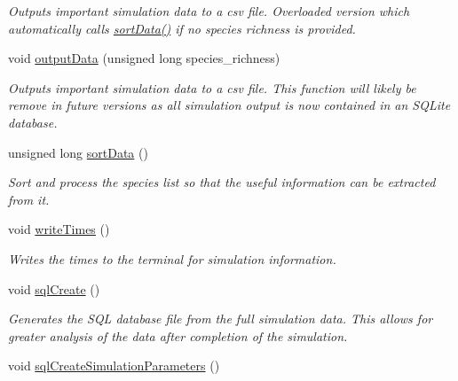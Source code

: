 \begin{DoxyCompactItemize}
\begin{DoxyCompactList}\small\item\em Outputs important simulation data to a csv file. Overloaded version which automatically calls \hyperlink{class_tree_a2d2065bbebee8b55270d2691d40cd974}{sort\+Data()} if no species richness is provided. \end{DoxyCompactList}\item 
void \hyperlink{class_tree_a5acf7d0eea9ea2ef4928bb6691b87724}{output\+Data} (unsigned long species\+\_\+richness)
\begin{DoxyCompactList}\small\item\em Outputs important simulation data to a csv file. This function will likely be remove in future versions as all simulation output is now contained in an S\+Q\+Lite database. \end{DoxyCompactList}\item 
unsigned long \hyperlink{class_tree_a2d2065bbebee8b55270d2691d40cd974}{sort\+Data} ()\hypertarget{class_tree_a2d2065bbebee8b55270d2691d40cd974}{}\label{class_tree_a2d2065bbebee8b55270d2691d40cd974}

\begin{DoxyCompactList}\small\item\em Sort and process the species list so that the useful information can be extracted from it. \end{DoxyCompactList}\item 
void \hyperlink{class_tree_ab8785fc9e27868a56335048321c13290}{write\+Times} ()\hypertarget{class_tree_ab8785fc9e27868a56335048321c13290}{}\label{class_tree_ab8785fc9e27868a56335048321c13290}

\begin{DoxyCompactList}\small\item\em Writes the times to the terminal for simulation information. \end{DoxyCompactList}\item 
void \hyperlink{class_tree_ae784a6ed362f6c5263ee797759f715b6}{sql\+Create} ()\hypertarget{class_tree_ae784a6ed362f6c5263ee797759f715b6}{}\label{class_tree_ae784a6ed362f6c5263ee797759f715b6}

\begin{DoxyCompactList}\small\item\em Generates the S\+QL database file from the full simulation data. This allows for greater analysis of the data after completion of the simulation. \end{DoxyCompactList}\item 
void \hyperlink{class_tree_a199f47b62b9b10917ff8b89d20c543a7}{sql\+Create\+Simulation\+Parameters} ()\hypertarget{class_tree_a199f47b62b9b10917ff8b89d20c543a7}{}\label{class_tree_a199f47b62b9b10917ff8b89d20c543a7}


\end{DoxyCompactItemize}
